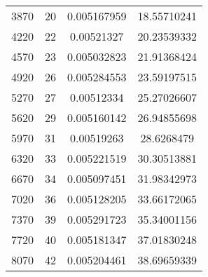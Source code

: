 \documentclass[a4paper,12pt]{article} %
\begin{document}
\begin{table}[H]
{\begin{tabular}{|c|c|c|c|}
			3870                                               & 20                   & 0.005167959              & 18.55710241                                          \\
			4220                                               & 22                   & 0.00521327               & 20.23539332                                          \\
			4570                                               & 23                   & 0.005032823              & 21.91368424                                          \\
			4920                                               & 26                   & 0.005284553              & 23.59197515                                          \\
			5270                                               & 27                   & 0.00512334               & 25.27026607                                          \\
			5620                                               & 29                   & 0.005160142              & 26.94855698                                          \\
			5970                                               & 31                   & 0.00519263               & 28.6268479                                           \\
			6320                                               & 33                   & 0.005221519              & 30.30513881                                          \\
			6670                                               & 34                   & 0.005097451              & 31.98342973                                          \\
			7020                                               & 36                   & 0.005128205              & 33.66172065                                          \\
			7370                                               & 39                   & 0.005291723              & 35.34001156                                          \\
			7720                                               & 40                   & 0.005181347              & 37.01830248                                          \\
			8070                                               & 42                   & 0.005204461              & 38.69659339                                          \\

\end{tabular}}
\end{table}
\end{document}
